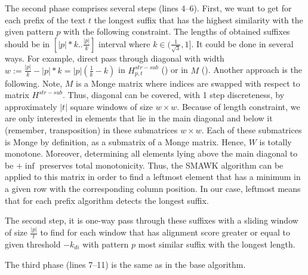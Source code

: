 The second phase comprises several steps (lines 4--6).
First, we want to get for each prefix of the text $t$ the longest suffix that has the highest similarity with the given pattern $p$ with the following constraint.
The lengths of obtained suffixes should be in $[|p|*k..\frac{|p|}{k}]$ interval where $k \in (\frac{1}{\sqrt{3}},1]$.
It could be done in several ways.
For example, direct pass through diagonal with width $w:= \frac{|p|}{k} - |p|*k = |p|(\frac{1}{k} - k)$ in $H^{str-sub}_{p,t}$ () or in $M$ ().
Another approach is the following.
Note, $M$ is a Monge matrix where indices are swapped with respect to matrix $H^{str-sub}$.
Thus, diagonal can be covered, with 1 step discreteness, by approximately $ | t | $ square windows of size $ w \times w $.
Because of length constraint, we are only interested in elements that lie in the main diagonal and below it (remember, transposition) in these submatrices $w\times w$.
Each of these submatrices is Monge by definition, as a submatrix of a Monge matrix.
Hence, $W$ is totally monotone.
Moreover, determining all elements lying above the main diagonal to be $+\inf$ preserves total monotonicity.
Thus, the \textrm{SMAWK} algorithm\cite{.} can be applied to this matrix in order to find a leftmost element that has a minimum in a given row with the corresponding column position.
In our case, leftmost means that for each prefix algorithm detects the longest suffix.

The second step, it is one-way pass through these suffixes with a sliding window of size $\frac{|p|}{t}$ to find for each window that has alignment score greater or equal to given threshold $-k_{di}$ with pattern $p$ most similar suffix with the longest length. 

The third phase (lines 7--11) is the same as in the base algorithm.

